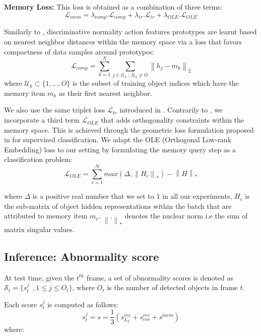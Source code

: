 \documentclass{article}
\begin{document}
\textbf{Memory Loss:} This loss is obtained as a combination of three terms:
$$\mathcal{L}_{mem} =\lambda_{comp}.\mathcal{L}_{comp}+ \lambda_{tr}.\mathcal{L}_{tr}+\lambda_{OLE}.\mathcal{L}_{OLE}$$


Similarly to \cite{mnad}, discriminative normality action features prototypes are learnt based on nearest neighbor distances within the memory space via a loss that favors compactness of data samples around prototypes: 
\begin{equation*}
\mathcal{L}_{comp} = \sum_{k=1}^{N}\sum_{j\in\mathcal{U}_{k} \;;\;  \mathcal{U}_{k}\neq \text{\O} } \left\lVert h_{j} - m_{k}\right\rVert_{2} 
\end{equation*}
where $\mathcal{U}_{k} \subset \{1,...,O\}$ is the subset of training object indices which have the memory item $m_{k}$ as their first nearest neighbor.



We also use the same triplet loss $\mathcal{L}_{tr}$ introduced in \cite{mnad}. Contrarily to \cite{mnad}, we incorporate a third term $\mathcal{L}_{OLE}$ that adds orthogonality constraints within the memory space. This is achieved through the geometric loss formulation proposed in \cite{ole_Lezama2018} for supervised classification. We adapt the OLE (Orthogonal Low-rank Embedding) loss to our setting by formulating the memory query step as a classification problem: 
\begin{equation*}
\mathcal{L}_{OLE} = \sum_{c=1}^{N} max(\Delta , \left\lVert H_{c} \right\rVert_{*}) - \left\lVert H \right\rVert_{*} 
\end{equation*}

where $\Delta$ is a positive real number that we set to 1 in all our experiments, $H_{c}$ is the sub-matrix of object hidden representations within the batch that are attributed to memory item $m_{c}$.
$\left\lVert . \right\rVert_{*}$ denotes the nuclear norm i.e the sum of matrix singular values. 


\subsection{Inference: Abnormality score} \label{subsec:abn_sco}

At test time, given the $t^{th}$ frame, a set of abnormality scores is denoted as $\mathcal{S}_{t} = \{s_{t}^{j}\ \; ,1\leq j\leq O_{t}\}$, where $O_{t}$ is the number of detected objects in frame $t$. 

Each score $s_{t}^{j}$ is computed as follows: 
\begin{equation*} \label{eq:ano_score}
	s_{t}^{j} = s = 
	\frac{1}{3}\left(s^{rec}_{L_{2}}+s^{rec}_{cos}+s^{mem}\right)
\end{equation*}
where:
\end{document}
